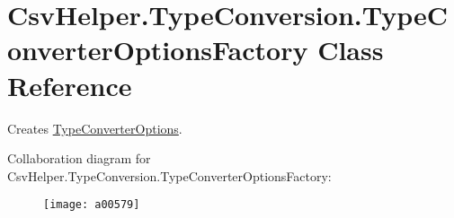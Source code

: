 \hypertarget{a00181}{\section{Csv\-Helper.\-Type\-Conversion.\-Type\-Converter\-Options\-Factory Class Reference}
\label{a00181}
}


Creates \hyperlink{a00180}{Type\-Converter\-Options}.  




Collaboration diagram for Csv\-Helper.\-Type\-Conversion.\-Type\-Converter\-Options\-Factory\-:
\nopagebreak
\begin{figure}[H]
\begin{center}
\leavevmode
\texttt{[image: a00579]}
\end{center}
\end{figure}
